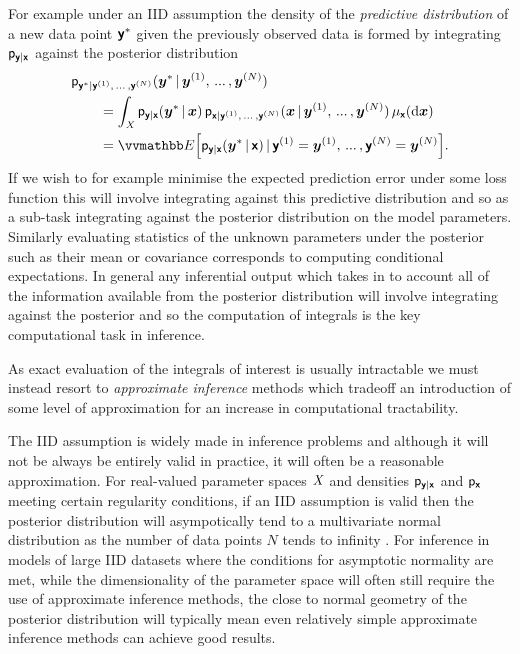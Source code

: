 For example under an \ac{IID} assumption the density of the \emph{predictive distribution} of a new data point $\boldsymbol{\mathsf{y}}^*$ given the previously observed data is formed by integrating $\mathsf{p}_{\boldsymbol{\mathsf{y}}|\boldsymbol{\mathsf{x}}}$ against the posterior distribution
\begin{equation}\label{eq:iid-predictive-distribution}
\begin{split}
  &\pden{\rvct{y}^*|\rvct{y}^{(1)},\,...\,,\rvct{y}^{(N)}}(\vct{y}^* \gvn \vct{y}^{(1)},\,...\,,\vct{y}^{(N)}) \\
  &\qquad = 
  \int_{\set{X}} 
    \pden{\rvct{y}|\rvct{x}}(\vct{y}^*\gvn\vct{x})\,
    \pden{\rvct{x}|\rvct{y}^{(1)},\,...\,,\rvct{y}^{(N)}}(\vct{x} \gvn \vct{y}^{(1)},\,...\,,\vct{y}^{(N)})
  \,\mu_{\rvct{x}}(\dr \vct{x})
  \\
  & \qquad =
  \expc{\pden{\rvct{y}|\rvct{x}}(\vct{y}^*\gvn\rvct{x}) \gvn \rvct{y}^{(1)} = \vct{y}^{(1)},\,...\,,\rvct{y}^{(N)} = \vct{y}^{(N)}}.
\end{split}
\end{equation}
If we wish to for example minimise the expected prediction error under some loss function this will involve integrating against this predictive distribution and so as a sub-task integrating against the posterior distribution on the model parameters. Similarly evaluating statistics of the unknown parameters under the posterior such as their mean or covariance corresponds to computing conditional expectations. In general any inferential output which takes in to account all of the information available from the posterior distribution will involve integrating against the posterior and so the computation of integrals is the key computational task in inference.

As exact evaluation of the integrals of interest is usually intractable we must instead resort to \emph{approximate inference} methods which tradeoff an introduction of some level of approximation for an increase in computational tractability. %

The \ac{IID} assumption is widely made in inference problems and although it will not be always be entirely valid in practice, it will often be a reasonable approximation. For real-valued parameter spaces $\mathit{X}$ and densities $\mathsf{p}_{\boldsymbol{\mathsf{y}}|\boldsymbol{\mathsf{x}}}$ and $\mathsf{p}_{\boldsymbol{\mathsf{x}}}$ meeting certain regularity conditions, if an \ac{IID} assumption is valid then the posterior distribution will asympotically tend to a multivariate normal distribution as the number of data points $N$ tends to infinity \citep{hartigan1983bayes}. For inference in models of large \ac{IID} datasets where the conditions for asymptotic normality are met, while the dimensionality of the parameter space will often still require the use of approximate inference methods, the close to normal geometry of the posterior distribution will typically mean even relatively simple approximate inference methods can achieve good results. %

